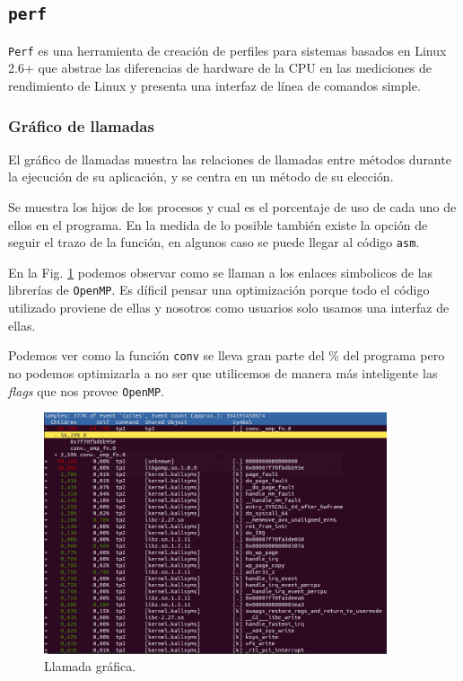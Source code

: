 \documentclass[a4paper]{article}
\begin{document}
\subsection{\texttt{perf}}
\texttt{Perf} es una herramienta de creación de perfiles para sistemas basados ​​en Linux 2.6+ que abstrae las diferencias de hardware de la CPU en las mediciones de rendimiento de Linux y presenta una interfaz de línea de comandos simple.

\subsubsection{Gráfico de llamadas}
El gráfico de llamadas muestra las relaciones de llamadas entre métodos durante la ejecución de su aplicación, y se centra en un método de su elección.

Se muestra los hijos de los procesos y cual es el porcentaje de uso de cada uno de ellos en el programa. En la medida de lo posible también existe la opción de seguir el trazo de la función, en algunos caso se puede llegar al código \texttt{asm}.

En la Fig. \ref{fig:grafcall} podemos observar como se llaman a los enlaces simbolicos de las librerías de \texttt{OpenMP}. Es díficil pensar una optimización  porque todo el código utilizado proviene de ellas y nosotros como usuarios solo usamos una interfaz de ellas.

Podemos ver como la función \texttt{conv} se lleva gran parte del \% del programa pero no podemos optimizarla a no ser que utilicemos de manera más inteligente las \textit{flags} que nos provee \texttt{OpenMP}.

\begin{figure}[H]
	\begin{center}		
	\includegraphics[width=0.9\textwidth]{005.png}
  	\caption{Llamada gráfica.}
  	\label{fig:grafcall}
  	\end{center}
\end{figure}
\end{document}
